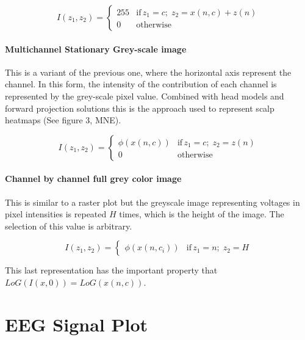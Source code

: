 \begin{equation}
I(z_1,z_2) = \left\{ \begin{array}{rl}
255 & \text{if} \,  z_1 = c; \; z_2 =  x(n,c) + z(n) \\
0   & \mbox{otherwise}
\end{array}\right.
\label{eq:images}
\end{equation}

\paragraph{Multichannel Stationary Grey-scale image}

This is a variant of the previous one, where the horizontal axis represent the channel.   In this form, the intensity of the contribution of each channel is represented by the grey-scale pixel value.  Combined with head models and forward projection solutions this is the approach used to represent scalp heatmaps (See figure 3, MNE).

\begin{equation}
I(z_1,z_2) = \left\{ \begin{array}{rl}
\phi(x(n,c)) & \text{if} \,  z_1 = c; \; z_2 =  z(n) \\
0   & \mbox{otherwise}
\end{array}\right.
\label{eq:images}
\end{equation}


\paragraph{Channel by channel full grey color image}

This is similar to a raster plot but the greyscale image representing voltages in pixel intensities is repeated $H$ times, which is the height of the image.  The selection of this value is arbitrary.

\begin{equation}
I(z_1,z_2) = \left\{ \begin{array}{rl} \phi(x(n,c_i))  & \text{if} \,  z_1 = n; \; z_2 = H \end{array}\right.
\label{eq:images}
\end{equation}

This last representation has the important property that $ LoG(I(x,0)) = LoG(x(n,c)) $.

\section{EEG Signal Plot}


